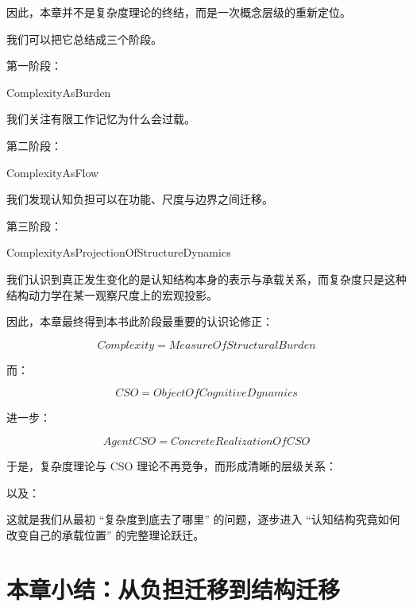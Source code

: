 因此，本章并不是复杂度理论的终结，而是一次概念层级的重新定位。

我们可以把它总结成三个阶段。

第一阶段：

\begin{statementbox}
ComplexityAsBurden
\end{statementbox}

我们关注有限工作记忆为什么会过载。

第二阶段：

\begin{statementbox}
ComplexityAsFlow
\end{statementbox}

我们发现认知负担可以在功能、尺度与边界之间迁移。

第三阶段：

\begin{statementbox}
ComplexityAsProjectionOfStructureDynamics
\end{statementbox}

我们认识到真正发生变化的是认知结构本身的表示与承载关系，而复杂度只是这种结构动力学在某一观察尺度上的宏观投影。

因此，本章最终得到本书此阶段最重要的认识论修正：

\[
\boxed{
Complexity
=
MeasureOfStructuralBurden
}
\]

而：

\[
\boxed{
CSO
=
ObjectOfCognitiveDynamics
}
\]

进一步：

\[
\boxed{
AgentCSO
=
ConcreteRealizationOfCSO
}
\]

于是，复杂度理论与 CSO 理论不再竞争，而形成清晰的层级关系：

\begin{statementbox}
\centering
{}
\end{statementbox}

以及：

\begin{statementbox}
\centering
{}
\end{statementbox}

这就是我们从最初 ``复杂度到底去了哪里'' 的问题，逐步进入 ``认知结构究竟如何改变自己的承载位置'' 的完整理论跃迁。

\section{本章小结：从负担迁移到结构迁移}
\label{sec:chapter12-summary}

